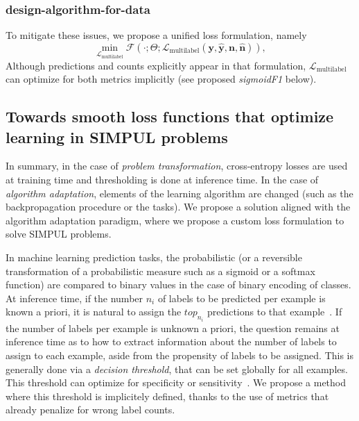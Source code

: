 \subsubsection{design-algorithm-for-data}

To mitigate these issues, we propose a unified loss formulation,
namely
%
\begin{equation}
\underset{\mathcal{L}_{\text {multilabel}}} {\min} \mathcal{F}\left(\cdot ;
\Theta; \mathcal{L}_{\text {multilabel}} (\mathbf{y}, \hat{\mathbf{y}},
\mathbf{n}, \hat{\mathbf{n}}) \right),
\end{equation}
%
Although predictions and counts explicitly appear in that formulation,
\(\mathcal{L}_{\text {multilabel}}\) can optimize for both metrics implicitly
(see proposed \emph{sigmoidF1} below).

\subsection{Towards smooth loss functions that optimize learning
in SIMPUL problems}
In summary, in the case of \emph{problem transformation},
cross-entropy losses are used at training time and thresholding is done at
inference time. In the case of \emph{algorithm adaptation}, elements of the
learning algorithm are changed (such as the backpropagation procedure or the
tasks). We propose a solution aligned with the algorithm adaptation paradigm,
where we propose a custom loss formulation to solve SIMPUL problems.

In machine learning prediction tasks, the probabilistic (or a reversible
transformation of a probabilistic measure such as a sigmoid or a softmax
function) are compared to binary values in the case of binary encoding of
classes. At inference time, if the number $n_i$ of labels to be predicted per
example is known a priori, it is natural to assign the $top_{n_i}$ predictions
to that example~\cite{lossTopKError, topKmulticlassSVM}. If the number of
labels per example is unknown a priori, the question remains at inference time
as to how to extract information about the number of labels to assign to each
example, aside from the propensity of labels to be assigned. This is generally
done via a \emph{decision threshold}, that can be set globally for all
examples. This threshold can optimize for specificity or
sensitivity~\cite{decisionThreshold}. We propose a method where this threshold
is implicitely defined, thanks to the use of metrics that already penalize for
wrong label counts.

